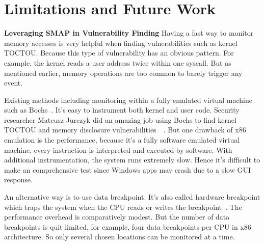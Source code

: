
\section{Limitations and Future Work}
\label{sec:limitation}


\textbf{Leveraging SMAP in Vulnerability Finding  } Having a fast way to monitor memory accesses is very helpful when finding vulnerabilities such as kernel TOCTOU. Because this type of vulnerability has an obvious pattern. For example, the kernel reads a user address twice within one syscall. But as mentioned earlier, memory operations are too common to barely trigger any event. 

Existing methods including monitoring within a fully emulated virtual machine such as Bochs~\cite{lawton2003bochs}. It's easy to instrument both kernel and user code. Security researcher Mateusz Jurczyk did an amazing job using Bochs to find kernel TOCTOU and memory disclosure vulnerabilities~\cite{jurczyk2013identifying}~\cite{bochspwnreloaded}. But one drawback of x86 emulation is the performance, because it's a fully software emulated virtual machine, every instruction is interpreted and executed by software. With additional instrumentation, the system runs extremely slow. Hence it's difficult to make an comprehensive test since Windows apps may crash due to a slow GUI response.

An alternative way is to use data breakpoint. It's also called hardware breakpoint which traps the system when the CPU reads or writes the breakpoint~\cite{erickson2010effective}. The performance overhead is comparatively modest. But the number of data breakpoints is quit limited, for example, four data breakpoints per CPU in x86 architecture. So only several chosen locations can be monitored at a time.



